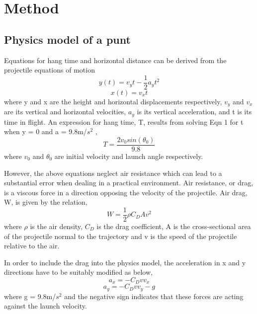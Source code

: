 \documentclass[conference]{IEEEtran}
\begin{document}
\section{Method}
\subsection{Physics model of a punt}
Equations for hang time and horizontal distance can be derived from the projectile equations of motion
\begin{equation}
y(t) = v_{y}t - \frac{1}{2}a_{y}t^{2}
\end{equation}
\begin{equation}
x(t) = v_{x}t
\end{equation}
where y and x are the height and horizontal displacements respectively, $v_{y}$ and $v_{x}$ are its vertical and horizontal velocities, $a_{y}$ is its vertical acceleration, and t is its time in flight. An expression for hang time, T, results from solving Eqn 1 for t when y = 0 and a = 9.8m/$s^{2}$ ,
\begin{equation}
T = \frac{2v_{0} sin(\theta_{0})}{9.8}
\end{equation}
where $v_{0}$ and $\theta_{0}$ are initial velocity and launch angle respectively. 

However, the above equations neglect air resistance which can lead to a substantial error when dealing in a practical environment. Air resistance, or drag, is a viscous force in a direction opposing the velocity of the projectile. Air drag, W, is given by the relation,
\begin{equation}
W = \frac{1}{2}\rho{C_{D}}Av^{2} 
\end{equation}
where $\rho$ is the air density, $C_{D}$ is the drag coefficient, A is the cross-sectional area of the projectile normal to the trajectory and v is the speed of the projectile relative to the air.

In order to include the drag into the physics model, the acceleration in x and y directions have to be suitably modified as below,
\begin{equation}
a_{x} = -C_{D}vv_{x}
\end{equation}
\begin{equation}
a_{y} = -C_{D}vv_{y} - g
\end{equation}
where g = 9.8m/$s^{2}$ and the negative sign indicates that these forces are acting against the launch velocity. 
\end{document}
